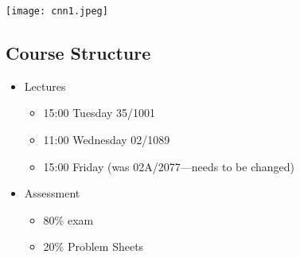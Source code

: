 
\vspace{-1cm}
\begin{center}
\noindent\texttt{[image: cnn1.jpeg]}
\end{center}
\renewcommand{\Outline}{%
\begin{slide}
\section[1]{Outline}

\begin{minipage}{12cm}\raggedright
  \begin{enumerate}\squeeze
    \outlineitem{Course Outline}{outline}
  \end{enumerate}
\end{minipage}\hfill
\begin{minipage}{10cm}
  \texttt{[image: cnn1.jpeg]}
\end{minipage}
\end{slide}
\addtocounter{outlineitem}{1}
}

\setcounter{outlineitem}{1}



\begin{slide}
\section{Course Structure}

\begin{PauseHighLight}
  \begin{itemize}
  \item Lectures
    \begin{itemize}
    \item 15:00 Tuesday 35/1001
    \item 11:00 Wednesday 02/1089
    \item 15:00 Friday (was 02A/2077---needs to be changed)\pause
    \end{itemize}
  \item Assessment
    \begin{itemize}
    \item 80\% exam
    \item 20\% Problem Sheets\pause
    \end{itemize}
  \end{itemize}
\end{PauseHighLight}

\end{slide}

